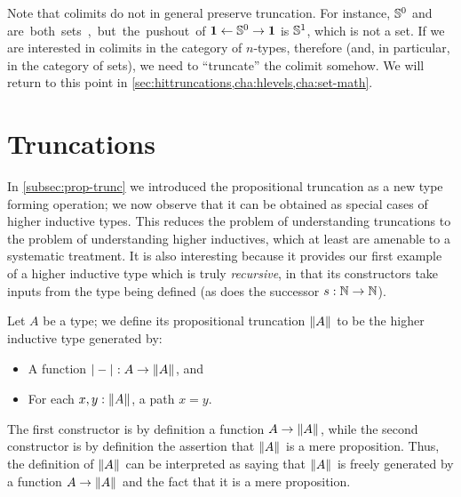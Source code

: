\begin{rmk}
  Note that colimits do not in general preserve truncation.
  For instance, $\mathbb{S}^0$ and \unit are both sets, but the pushout of $\mathbf{1} \leftarrow \mathbb{S}^0 \to \mathbf{1}$ is $\mathbb{S}^1$, which is not a set.
  If we are interested in colimits in the category of $n$-types, therefore (and, in particular, in the category of sets), we need to ``truncate'' the colimit somehow.
  We will return to this point in \autoref{sec:hittruncations,cha:hlevels,cha:set-math}.
\end{rmk}



\section{Truncations}
\label{sec:hittruncations}

In \autoref{subsec:prop-trunc} we introduced the propositional truncation as a new type forming operation;
we now observe that it can be obtained as special cases of higher inductive types.
This reduces the problem of understanding truncations to the problem of understanding higher inductives, which at least are amenable to a systematic treatment.
It is also interesting because it provides our first example of a higher inductive type which is truly \emph{recursive}, in that its constructors take inputs from the type being defined (as does the successor $s:\mathbb{N}\to\mathbb{N}$).

Let $A$ be a type; we define its propositional truncation $\mathopen{}\left\Vert A\right\Vert_{}\mathclose{}$ to be the higher inductive type generated by:
\begin{itemize}
\item A function $|-|_{} : A \to \mathopen{}\left\Vert A\right\Vert_{}\mathclose{}$, and
\item For each $x,y:\mathopen{}\left\Vert A\right\Vert_{}\mathclose{}$, a path $x=y$.
\end{itemize}
The first constructor is by definition a function $A\to \mathopen{}\left\Vert A\right\Vert_{}\mathclose{}$, while the second constructor is by definition the assertion that $\mathopen{}\left\Vert A\right\Vert_{}\mathclose{}$ is a mere proposition.
Thus, the definition of $\mathopen{}\left\Vert A\right\Vert_{}\mathclose{}$ can be interpreted as saying that $\mathopen{}\left\Vert A\right\Vert_{}\mathclose{}$ is freely generated by a function $A\to\mathopen{}\left\Vert A\right\Vert_{}\mathclose{}$ and the fact that it is a mere proposition.

